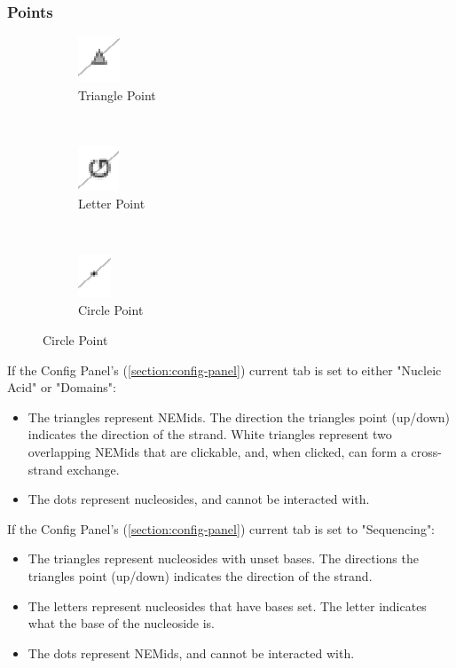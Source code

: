 \documentclass[
titlepage,
fontsize=12pt
]{article}
\begin{document}
	\subsubsection{Points}
	
	\begin{figure}[h]
		\centering
		\caption{Side View Plot Point Graphics}
		\label{fig:side-view-plot-point-graphics}
		
		\begin{subfigure}{.3\linewidth}
			\centering
			\includegraphics[width=.3in]{up-triangle.png}
			\caption{Triangle Point}
			\label{fig:up-triangle}
		\end{subfigure}%
 		~
		\begin{subfigure}{.3\linewidth}
			\centering
			\includegraphics[width=.3in]{base-symbol.png}
			\caption{Letter Point}
			\label{fig:base-symbol}
		\end{subfigure}%
		~
		\begin{subfigure}{.3\linewidth}
			\centering
			\includegraphics[width=.3in]{nondominant-point.png}
			\caption{Circle Point}
			\label{fig:nondominant-point}
		\end{subfigure}
	\end{figure}

	If the Config Panel's (\ref{section:config-panel}) current tab is set to either "Nucleic Acid" or "Domains":
	\begin{itemize}
		\item The triangles represent NEMids. The direction the triangles point (up/down) indicates the direction of the strand. White triangles represent two overlapping NEMids that are clickable, and, when clicked, can form a cross-strand exchange.
		\item The dots represent nucleosides, and cannot be interacted with.
	\end{itemize}

	If the Config Panel's (\ref{section:config-panel}) current tab is set to "Sequencing":
	\begin{itemize}
		\item The triangles represent nucleosides with unset bases. The directions the triangles point (up/down) indicates the direction of the strand.
		\item The letters represent nucleosides that have bases set. The letter indicates what the base of the nucleoside is. 
		\item The dots represent NEMids, and cannot be interacted with.
	\end{itemize}
\end{document}
